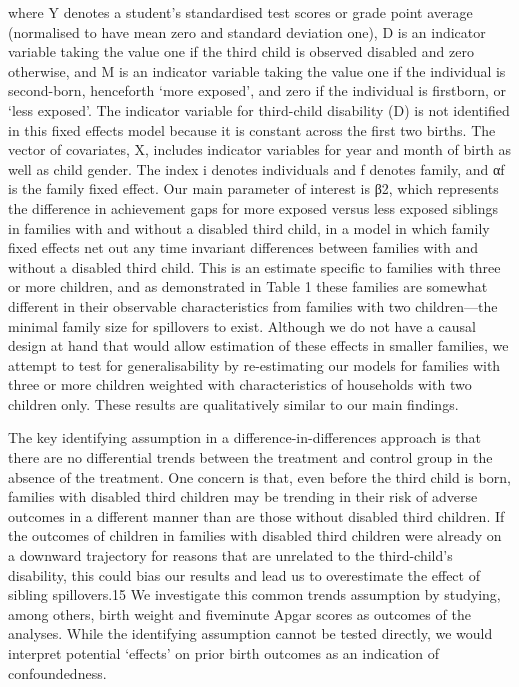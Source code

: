 where Y denotes a student’s standardised test scores or grade point average (normalised to have mean zero and standard deviation one), D is an indicator variable taking the value one if the third child is observed disabled and zero otherwise, and M is an indicator variable taking the value one if the individual is second-born, henceforth ‘more exposed’, and zero if the individual is firstborn, or ‘less exposed’. The indicator variable for third-child disability (D) is not identified in this fixed effects model because it is constant across the first two births. The vector of covariates, X, includes indicator variables for year and month of birth as well as child gender. The index i denotes individuals and f denotes family, and αf is the family fixed effect. Our main parameter of interest is β2, which represents the difference in achievement gaps for more exposed versus less exposed siblings in families with and without a disabled third child, in a model in which family fixed effects net out any time invariant differences between families with and without a disabled third child. This is an estimate specific to families with three or more children, and as demonstrated in Table 1 these families are somewhat different in their observable characteristics from families with two children—the minimal family size for spillovers to exist. Although we do not have a causal design at hand that would allow estimation of these effects in smaller families, we attempt to test for generalisability by re-estimating our models for families with three or more children weighted with characteristics of households with two children only. These results are qualitatively similar to our main findings.

The key identifying assumption in a difference-in-differences approach is that there are no differential trends between the treatment and control group in the absence of the treatment. One concern is that, even before the third child is born, families with disabled third children may be trending in their risk of adverse outcomes in a different manner than are those without disabled third children. If the outcomes of children in families with disabled third children were already on a downward trajectory for reasons that are unrelated to the third-child’s disability, this could bias our results and lead us to overestimate the effect of sibling spillovers.15 We investigate this common trends assumption by studying, among others, birth weight and fiveminute Apgar scores as outcomes of the analyses. While the identifying assumption cannot be tested directly, we would interpret potential ‘effects’ on prior birth outcomes as an indication of confoundedness. 

